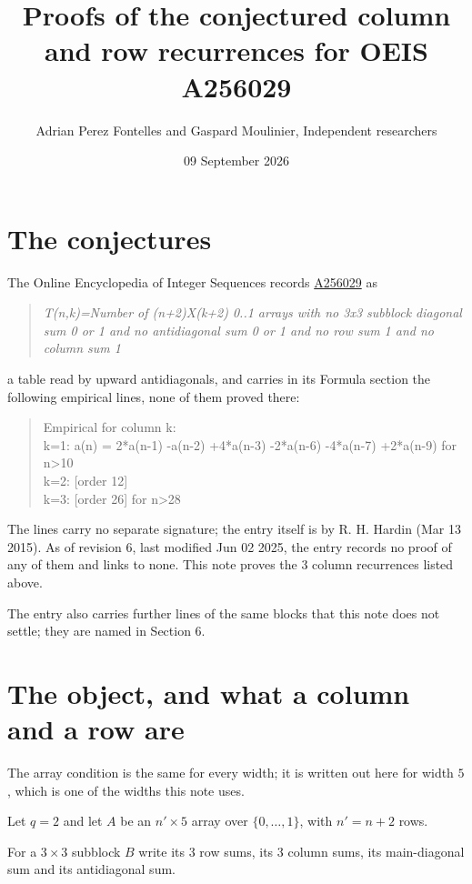 \documentclass[11pt]{article}
\title{Proofs of the conjectured column and row recurrences for OEIS A256029}
\author{Adrian Perez Fontelles and Gaspard Moulinier, Independent researchers}
\date{09 September 2026}
\theoremstyle{definition}
\begin{document}
\maketitle
\section{The conjectures}

The Online Encyclopedia of Integer Sequences records \href{https://oeis.org/A256029}{A256029} as

\begin{quote}\itshape T(n,k)=Number of (n+2)X(k+2) 0..1 arrays with no 3x3 subblock diagonal sum 0 or 1 and no antidiagonal sum 0 or 1 and no row sum 1 and no column sum 1\end{quote}

a table read by upward antidiagonals, and carries in its Formula section the following empirical lines, none of them proved there:

\begin{quote}\ttfamily Empirical for column k:\\
k=1: a(n) = 2*a(n-1) -a(n-2) +4*a(n-3) -2*a(n-6) -4*a(n-7) +2*a(n-9) for n>10\\k=2: [order 12]\\k=3: [order 26] for n>28\end{quote}

The lines carry no separate signature; the entry itself is by R. H. Hardin (Mar 13 2015). As of revision 6, last modified Jun 02 2025, the entry records no proof of any of them and links to none. This note proves the 3 column recurrences listed above.

The entry also carries further lines of the same blocks that this note does not settle; they are named in Section 6.

\section{The object, and what a column and a row are}

The array condition is the same for every width; it is written out here for width $5$, which is one of the widths this note uses.

Let $q = 2$ and let $A$ be an $n' \times 5$ array over $\{0,\dots,1\}$, with $n' = n + 2$ rows.

For a $3\times3$ subblock $B$ write its 3 row sums, its 3 column sums, its main-diagonal sum and its antidiagonal sum.
\end{document}
